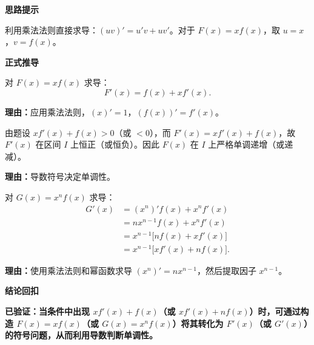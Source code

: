 \begin{proofbox}

	\textbf{\textcolor{CProof}{思路提示}}

	利用乘法法则直接求导：$(u v)' = u' v + u v'$。对于 $F(x)=x f(x)$，取 $u=x$，$v=f(x)$。

	\medskip
	\textbf{\textcolor{CProof}{正式推导}}
	\begin{description}[style=nextline, leftmargin=2.8em, labelsep=0.5em, itemsep=0.55em]
		\item[\textbf{步骤一（主结论求导）：}]
			对 $F(x)=x f(x)$ 求导：
			\[
				F'(x) = f(x) + x f'(x).
			\]
			\par\textbf{理由：}应用乘法法则，$(x)'=1$，$(f(x))'=f'(x)$。

		\item[\textbf{步骤二（符号判据）：}]
			由题设 $x f'(x)+f(x) > 0$（或 $<0$），而 $F'(x) = x f'(x)+f(x)$，故 $F'(x)$ 在区间 $I$ 上恒正（或恒负）。因此 $F(x)$ 在 $I$ 上严格单调递增（或递减）。
			\par\textbf{理由：}导数符号决定单调性。

		\item[\textbf{步骤三（推广求导）：}]
			对 $G(x)=x^n f(x)$ 求导：
			\[
				\begin{aligned}
					G'(x) &= (x^n)' f(x) + x^n f'(x) \\
					&= n x^{n-1} f(x) + x^n f'(x) \\
					&= x^{n-1}\bigl[ n f(x) + x f'(x) \bigr] \\
					&= x^{n-1}\bigl[ x f'(x) + n f(x) \bigr].
			\end{aligned}
			\]
			\par\textbf{理由：}使用乘法法则和幂函数求导 $(x^n)' = n x^{n-1}$，然后提取因子 $x^{n-1}$。

	\end{description}

	\medskip
	\textbf{\textcolor{CProof}{结论回扣}}

	\textbf{已验证：当条件中出现 $x f'(x)+f(x)$（或 $x f'(x)+n f(x)$）时，可通过构造 $F(x)=x f(x)$（或 $G(x)=x^n f(x)$）将其转化为 $F'(x)$（或 $G'(x)$）的符号问题，从而利用导数判断单调性。}
\end{proofbox}
